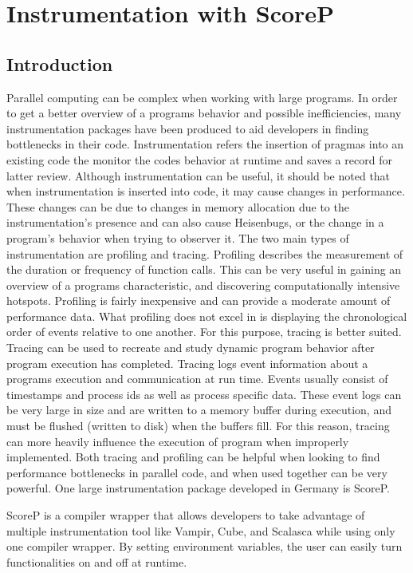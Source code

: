 \chapter{Instrumentation with ScoreP}
\label{cha:scorep}

\section{Introduction}

Parallel computing can be complex when working with large programs. In order to
get a better overview of a programs behavior and possible inefficiencies, many
instrumentation packages have been produced to aid developers in finding
bottlenecks in their code. Instrumentation refers the insertion of pragmas into
an existing code the monitor the codes behavior at runtime and saves a record
for latter review. Although instrumentation can be useful, it should be noted
that when instrumentation is inserted into code, it may cause changes in
performance. These changes can be due to changes in memory allocation due to
the instrumentation's presence and can also cause Heisenbugs, or the change in
a program's behavior when trying to observer it. The two main types of
instrumentation are profiling and tracing. Profiling describes the measurement
of the duration or frequency of function calls. This can be very useful in
gaining an overview of a programs characteristic, and discovering
computationally intensive hotspots. Profiling is fairly inexpensive and can
provide a moderate amount of performance data. What profiling does not excel in
is displaying the chronological order of events relative to one another. For
this purpose, tracing is better suited. Tracing can be used to recreate and
study dynamic program behavior after program execution has completed. Tracing
logs event information about a programs execution and communication at run
time. Events usually consist of timestamps and process ids as well as process
specific data. These event logs can be very large in size and are written to a
memory buffer during execution, and must be flushed (written to disk) when the
buffers fill. For this reason, tracing can more heavily influence the execution
of program when improperly implemented. Both tracing and profiling can be
helpful when looking to find performance bottlenecks in parallel code, and when
used together can be very powerful. One large instrumentation package developed
in Germany is ScoreP.

ScoreP is a compiler wrapper that allows developers to take advantage of
multiple instrumentation tool like Vampir, Cube, and Scalasca while using only
one compiler wrapper. By setting environment variables, the user can easily turn
functionalities on and off at runtime.

